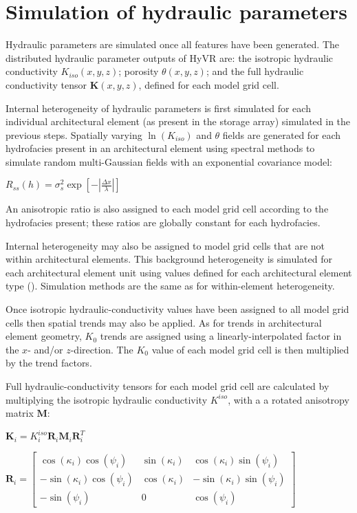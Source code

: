 \documentclass[letterpaper,10pt,english]{sphinxmanual}
\begin{document}
\section{Simulation of hydraulic parameters}
\label{methods:simulation-of-hydraulic-parameters}
Hydraulic parameters are simulated once all features have been generated. The distributed hydraulic parameter outputs of HyVR are: the isotropic hydraulic conductivity \(K_{iso}(x,y,z)\); porosity \(\theta(x,y,z)\); and the full hydraulic conductivity tensor \(\textbf{K}(x,y,z)\), defined for each model grid cell.

Internal heterogeneity of hydraulic parameters is first simulated for each individual architectural element (as present in the  storage array)  simulated in the previous steps. Spatially varying \(\ln(K_{iso})\) and \(\theta\) fields are generated for each hydrofacies present in an architectural element using spectral methods to simulate random multi-Gaussian fields with an exponential covariance model:

\(R_{ss}(h)=\sigma^2_s \exp\left[ - \left| \frac{\Delta x}{\lambda}\right| \right]\)

An anisotropic ratio is also assigned to each model grid cell according to the hydrofacies present; these ratios are globally constant for each hydrofacies.

Internal heterogeneity may also be assigned to model grid cells that are not within architectural elements. This background heterogeneity is simulated for each architectural element unit using values defined for each architectural element type (). Simulation methods are the same as for within-element heterogeneity.

Once isotropic hydraulic-conductivity values have been assigned to all model grid cells then spatial trends may also be applied. As for trends in architectural element geometry, \(K_0\) trends are assigned using a linearly-interpolated factor in the \(x\)- and/or \(z\)-direction. The \(K_0\) value of each model grid cell is then multiplied by the trend factors.

Full hydraulic-conductivity tensors for each model grid cell are  calculated by multiplying the isotropic hydraulic conductivity \(K^{iso}\), with a
a rotated anisotropy matrix \(\textbf{M}\):

\(\textbf{K}_i =K^{iso}_i\textbf{R}_i\textbf{M}_i\textbf{R}_i^T\)

\(\textbf{R}_i = \begin{bmatrix} \cos(\kappa_i)\cos(\psi_i) & \sin(\kappa_i) & \cos(\kappa_i)\sin(\psi_i)\\ -\sin(\kappa_i)\cos(\psi_i) & \cos(\kappa_i) & -\sin(\kappa_i)\sin(\psi_i)\\ -\sin(\psi_i) & 0 & \cos(\psi_i) \end{bmatrix}\)
\end{document}
